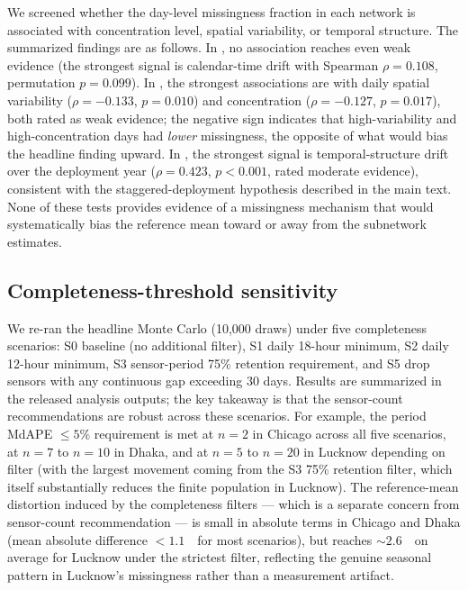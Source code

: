 We screened whether the day-level missingness fraction in each network is associated with concentration level, spatial variability, or temporal structure. The summarized findings are as follows. In , no association reaches even weak evidence (the strongest signal is calendar-time drift with Spearman $\rho = 0.108$, permutation $p = 0.099$). In , the strongest associations are with daily spatial variability ($\rho = -0.133$, $p = 0.010$) and concentration ($\rho = -0.127$, $p = 0.017$), both rated as weak evidence; the negative sign indicates that high-variability and high-concentration days had \emph{lower} missingness, the opposite of what would bias the headline finding upward. In , the strongest signal is temporal-structure drift over the deployment year ($\rho = 0.423$, $p < 0.001$, rated moderate evidence), consistent with the staggered-deployment hypothesis described in the main text. None of these tests provides evidence of a missingness mechanism that would systematically bias the reference mean toward or away from the subnetwork estimates.

\subsection{Completeness-threshold sensitivity}\label{sec:si_completeness_threshold}

We re-ran the headline Monte Carlo (10{,}000 draws) under five completeness scenarios: S0 baseline (no additional filter), S1 daily 18-hour minimum, S2 daily 12-hour minimum, S3 sensor-period 75\% retention requirement, and S5 drop sensors with any continuous gap exceeding 30 days. Results are summarized in the released analysis outputs; the key takeaway is that the sensor-count recommendations are robust across these scenarios. For example, the period MdAPE $\le 5\%$ requirement is met at $n=2$ in Chicago across all five scenarios, at $n=7$ to $n=10$ in Dhaka, and at $n=5$ to $n=20$ in Lucknow depending on filter (with the largest movement coming from the S3 75\% retention filter, which itself substantially reduces the finite population in Lucknow). The reference-mean distortion induced by the completeness filters --- which is a separate concern from sensor-count recommendation --- is small in absolute terms in Chicago and Dhaka (mean absolute difference $< 1.1$~\units\ for most scenarios), but reaches $\sim 2.6$~\units\ on average for Lucknow under the strictest filter, reflecting the genuine seasonal pattern in Lucknow's missingness rather than a measurement artifact.

